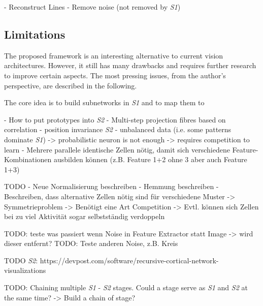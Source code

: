 - Reconstruct Lines
- Remove noise (not removed by \emph{S1})



\subsection{Limitations}
The proposed framework is an interesting alternative to current vision architectures.
However, it still has many drawbacks and requires further research to improve certain aspects.
The most pressing issues, from the author's perspective, are described in the following.

The core idea is to build subnetworks in \emph{S1} and to map them to 


- How to put prototypes into \emph{S2}
- Multi-step projection fibres based on correlation
- position invariance \emph{S2}
- unbalanced data (i.e. some patterns dominate \emph{S1}) -> probabilistic neuron is not enough -> requires competition to learn
- Mehrere parallele identische Zellen nötig, damit sich verschiedene Feature-Kombinationen ausbilden können (z.B. Feature 1+2 ohne 3 aber auch Feature 1+3)


TODO
- Neue Normalisierung beschreiben
- Hemmung beschreiben
- Beschreiben, dass alternative Zellen nötig sind für verschiedene Muster -> Symmetrieproblem -> Benötigt eine Art Competition -> Evtl. können sich Zellen bei zu viel Aktivität sogar selbstständig verdoppeln




TODO: teste was passiert wenn Noise in Feature Extractor statt Image -> wird dieser entfernt?
TODO: Teste anderen Noise, z.B. Kreis


TODO \emph{S2}: https://devpost.com/software/recursive-cortical-network-visualizations

TODO: Chaining multiple \emph{S1} - \emph{S2} stages. Could a stage serve as \emph{S1} and \emph{S2} at the same time? -> Build a chain of stage?